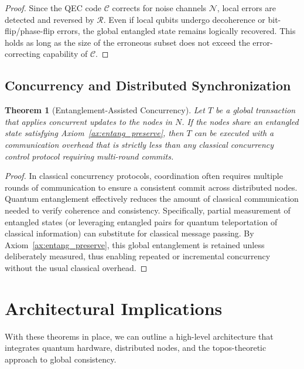 \documentclass[12pt]{article}
\newtheorem{theorem}{Theorem}[section]
\theoremstyle{definition}
\theoremstyle{remark}
\begin{document}
\begin{proof}
Since the QEC code $\mathcal{C}$ corrects for noise channels $\mathcal{N}$, local errors are detected and reversed by $\mathcal{R}$. Even if local qubits undergo decoherence or bit-flip/phase-flip errors, the global entangled state remains logically recovered. This holds as long as the size of the erroneous subset does not exceed the error-correcting capability of $\mathcal{C}$.
\end{proof}

\subsection{Concurrency and Distributed Synchronization}
\begin{theorem}[Entanglement-Assisted Concurrency]
\label{th:concurrency}
Let $T$ be a global transaction that applies concurrent updates to the nodes in $N$. If the nodes share an entangled state satisfying Axiom~\ref{ax:entang_preserve}, then $T$ can be executed with a communication overhead that is strictly less than any classical concurrency control protocol requiring multi-round commits.
\end{theorem}

\begin{proof}
In classical concurrency protocols, coordination often requires multiple rounds of communication to ensure a consistent commit across distributed nodes. Quantum entanglement effectively reduces the amount of classical communication needed to verify coherence and consistency. Specifically, partial measurement of entangled states (or leveraging entangled pairs for quantum teleportation of classical information) can substitute for classical message passing. By Axiom~\ref{ax:entang_preserve}, this global entanglement is retained unless deliberately measured, thus enabling repeated or incremental concurrency without the usual classical overhead.
\end{proof}

\section{Architectural Implications}
\label{sec:architectures}
With these theorems in place, we can outline a high-level architecture that integrates quantum hardware, distributed nodes, and the topos-theoretic approach to global consistency.
\end{document}
